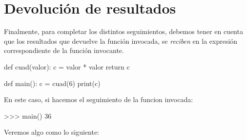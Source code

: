 \section{Devolución de resultados}

Finalmente, para completar los distintos seguimientos, debemos tener en
cuenta que los resultados que devuelve la función invocada, se {\it reciben}
en la expresión correspondiente de la función invocante.

\begin{codigo-python-sn}
def cuad(valor):
    c = valor * valor
    return c

def main():
    c = cuad(6)
    print(c)
\end{codigo-python-sn}

En este caso, si hacemos el seguimiento de la funcion invocada:
\begin{codigo-python-sn}
>>> main()
36
\end{codigo-python-sn}

Veremos algo como lo siguiente:

